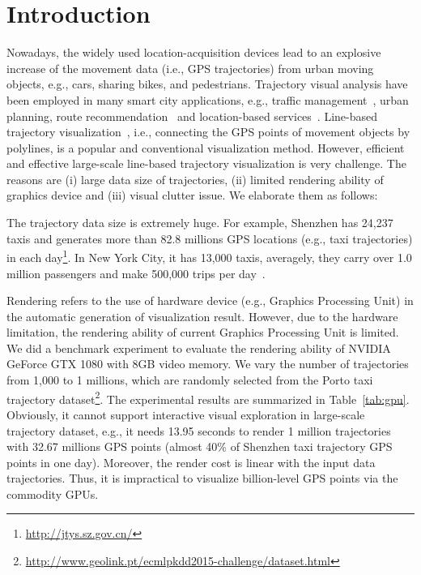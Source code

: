 \section{Introduction}\label{sec:intro}
Nowadays, the widely used location-acquisition devices lead to an explosive increase of the movement data (i.e., GPS trajectories) from urban moving objects, e.g., cars, sharing bikes, and pedestrians.
Trajectory visual analysis have been employed in many smart city applications, e.g.,  traffic management~\cite{wang2014visual}, urban planning, route recommendation~\cite{zheng2011learning} and location-based services~\cite{liu2016smartadp, zheng2010collaborative}.
Line-based trajectory visualization~\cite{chen2015survey}, i.e., connecting the GPS points of movement objects by polylines, is a popular and conventional visualization method.
However, efficient and effective large-scale line-based trajectory visualization is very challenge.
The reasons are (i) large data size of trajectories, (ii) limited rendering ability of graphics device and (iii) visual clutter issue.
We elaborate them as follows:

 The trajectory data size is extremely huge.
For example, Shenzhen has 24,237 taxis and generates more than 82.8 millions GPS locations (e.g., taxi trajectories) in each day\footnote{\url{http://jtys.sz.gov.cn/}}.
In New York City, it has 13,000 taxis, averagely, they carry over 1.0 million passengers and make 500,000 trips per day~\cite{ferreira2013visual}.

Rendering refers to the use of hardware device (e.g., Graphics Processing Unit) in the automatic generation of visualization result.
However, due to the hardware limitation, the rendering ability of current Graphics Processing Unit is limited.
We did a benchmark experiment to evaluate the rendering ability of NVIDIA GeForce GTX 1080 with 8GB video memory.
We vary the number of trajectories from 1,000 to 1 millions, which are randomly selected from the Porto taxi trajectory dataset\footnote{\url{http://www.geolink.pt/ecmlpkdd2015-challenge/dataset.html}}.
The experimental results are summarized in Table~\ref{tab:gpu}.
Obviously, it cannot support interactive visual exploration in large-scale trajectory dataset, e.g.,
it needs 13.95 seconds to render 1 million trajectories with 32.67 millions GPS points (almost 40\% of Shenzhen taxi trajectory GPS points in one day).
Moreover, the render cost is linear with the input data trajectories.
Thus, it is impractical to visualize billion-level GPS points via the commodity GPUs.

